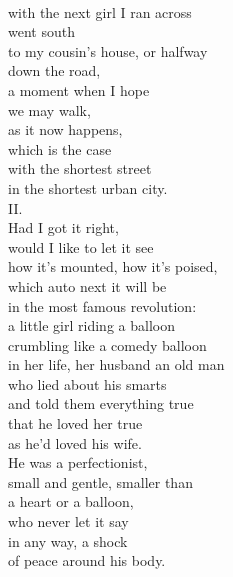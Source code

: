 \documentclass[smalldemyvopaper,11pt,twoside,onecolumn,openright,extrafontsizes]{memoir}
\begin{document}
\\with the next girl I ran across
\\went south
\\to my cousin's house, or halfway
\\down the road,
\\a moment when I hope
\\we may walk,
\\as it now happens,
\\which is the case
\\with the shortest street
\\in the shortest urban city.
\\II.
\\Had I got it right,
\\would I like to let it see
\\how it's mounted, how it's poised,
\\which auto next it will be
\\in the most famous revolution:
\\a little girl riding a balloon
\\crumbling like a comedy balloon
\\in her life, her husband an old man
\\who lied about his smarts
\\and told them everything true
\\that he loved her true
\\as he'd loved his wife.
\\He was a perfectionist,
\\small and gentle, smaller than
\\a heart or a balloon,
\\who never let it say
\\in any way, a shock
\\of peace around his body.
\end{document}
